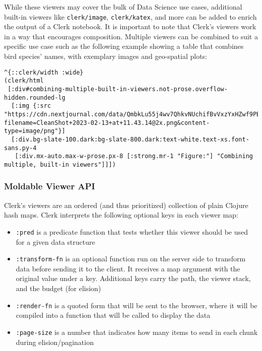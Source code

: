 \documentclass[
]{article}
\newcommand{\passthrough}[1]{#1}
\providecommand{\tightlist}{%
  \setlength{\itemsep}{0pt}\setlength{\parskip}{0pt}}
\begin{document}
While these viewers may cover the bulk of Data Science use cases, additional built-in viewers like \passthrough{\lstinline!clerk/image!}, \passthrough{\lstinline!clerk/katex!}, and more can be added to enrich the output of a Clerk notebook. It is important to note that Clerk's viewers work in a way that encourages composition. Multiple viewers can be combined to suit a specific use case such as the following example showing a table that combines bird species' names, with exemplary images and geo-spatial plots:

\begin{lstlisting}
^{::clerk/width :wide}
(clerk/html
 [:div#combining-multiple-built-in-viewers.not-prose.overflow-hidden.rounded-lg
  [:img {:src "https://cdn.nextjournal.com/data/QmbkLu55j4wv7QhkvNUchifBvVxzYxHZwf9PBNCkVM8ju9?filename=CleanShot+2023-02-13+at+11.43.14@2x.png&content-type=image/png"}]
  [:div.bg-slate-100.dark:bg-slate-800.dark:text-white.text-xs.font-sans.py-4
   [:div.mx-auto.max-w-prose.px-8 [:strong.mr-1 "Figure:"] "Combining multiple, built-in viewers"]]])
\end{lstlisting}

\hypertarget{id}{%
\subsubsection{Moldable Viewer API}\label{id}}

Clerk's viewers are an ordered (and thus prioritized) collection of plain Clojure hash maps. Clerk interprets the following optional keys in each viewer map:

\begin{itemize}
\tightlist
\item
  \passthrough{\lstinline!:pred!} is a predicate function that tests whether this viewer should be used for a given data structure
\item
  \passthrough{\lstinline!:transform-fn!} is an optional function run on the server side to transform data before sending it to the client. It receives a map argument with the original value under a key. Additional keys carry the path, the viewer stack, and the budget (for elision)
\item
  \passthrough{\lstinline!:render-fn!} is a quoted form that will be sent to the browser, where it will be compiled into a function that will be called to display the data
\item
  \passthrough{\lstinline!:page-size!} is a number that indicates how many items to send in each chunk during elision/pagination
\end{itemize}
\end{document}
